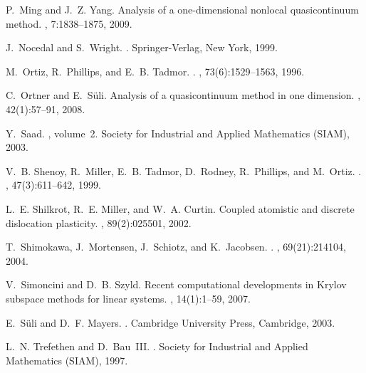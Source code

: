 \documentclass[12pt,reqno]{amsart}
\begin{document}
\begin{thebibliography}{10}
P.~Ming and J.~Z. Yang.
\newblock Analysis of a one-dimensional nonlocal quasicontinuum method.
, 7:1838--1875, 2009.

J.~Nocedal and S.~Wright.
.
\newblock Springer-Verlag, New York, 1999.

M.~Ortiz, R.~Phillips, and E.~B. Tadmor.
.
, 73(6):1529--1563, 1996.

C.~Ortner and E.~S{\"u}li.
\newblock Analysis of a quasicontinuum method in one dimension.
, 42(1):57--91, 2008.

Y.~Saad.
, volume~2.
\newblock Society for Industrial and Applied Mathematics (SIAM), 2003.

V.~B. Shenoy, R.~Miller, E.~B. Tadmor, D.~Rodney, R.~Phillips, and M.~Ortiz.
.
, 47(3):611--642, 1999.

L.~E. Shilkrot, R.~E. Miller, and W.~A. Curtin.
\newblock Coupled atomistic and discrete dislocation plasticity.
, 89(2):025501, 2002.

T.~Shimokawa, J.~Mortensen, J.~Schiotz, and K.~Jacobsen.
.
, 69(21):214104, 2004.

V.~Simoncini and D.~B. Szyld.
\newblock Recent computational developments in {K}rylov subspace methods for
  linear systems.
, 14(1):1--59, 2007.

E.~S{\"u}li and D.~F. Mayers.
.
\newblock Cambridge University Press, Cambridge, 2003.

L.~N. Trefethen and D.~Bau~III.
.
\newblock Society for Industrial and Applied Mathematics (SIAM), 1997.

\end{thebibliography}
\end{document}
